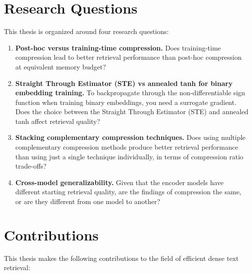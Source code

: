 \section{Research Questions}

This thesis is organized around four research questions:

\begin{enumerate}

    \item \textbf{Post-hoc versus training-time compression.}
    Does training-time compression lead to better retrieval performance than post-hoc compression at equivalent memory budget?

    \item \textbf{Straight Through Estimator (STE) vs annealed tanh for binary embedding training.}
    To backpropagate through the non-differentiable sign function when training binary embeddings, you need a surrogate gradient. Does the choice between the Straight Through Estimator (STE) and annealed tanh affect retrieval quality?

    \item \textbf{Stacking complementary compression techniques.}
    Does using multiple complementary compression methods produce better retrieval performance than using just a single technique individually, in terms of compression ratio trade-offs?

    \item \textbf{Cross-model generalizability.}
    Given that the encoder models have different starting retrieval quality, are the findings of compression the same, or are they different from one model to another?

\end{enumerate}

\section{Contributions}
\label{sec:contributions}

This thesis makes the following contributions to the field of efficient dense text retrieval:

